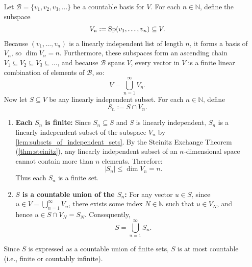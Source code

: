 \begin{exercisesolution}
\label{sol:countable_basis_independent_subsets}
Let $\mathcal{B} = \{v_1, v_2, v_3, \dots\}$ be a countable basis for $V$. For each $n \in \mathbb{N}$, define the subspace
\[
V_n := \operatorname{Sp}(v_1, \dots, v_n) \subseteq V.
\]
Because $(v_1, \dots, v_n)$ is a linearly independent list of length $n$, it forms a basis of $V_n$, so $\dim V_n = n$. Furthermore, these subspaces form an ascending chain $V_1 \subseteq V_2 \subseteq V_3 \subseteq \dots$, and because $\mathcal{B}$ spans $V$, every vector in $V$ is a finite linear combination of elements of $\mathcal{B}$, so:
\[
V = \bigcup_{n=1}^\infty V_n.
\]
Now let $S \subseteq V$ be any linearly independent subset. For each $n \in \mathbb{N}$, define
\[
S_n := S \cap V_n.
\]
\begin{enumerate}[label=\textbf{(\arabic*)}]
    \item \textbf{Each $S_n$ is finite:}
    Since $S_n \subseteq S$ and $S$ is linearly independent, $S_n$ is a linearly independent subset of the subspace $V_n$ by \cref{lem:subsets_of_independent_sets}. By the Steinitz Exchange Theorem (\cref{thm:steinitz}), any linearly independent subset of an $n$-dimensional space cannot contain more than $n$ elements. Therefore:
    \[
    |S_n| \le \dim V_n = n.
    \]
    Thus each $S_n$ is a finite set.

    \item \textbf{$S$ is a countable union of the $S_n$:}
    For any vector $u \in S$, since $u \in V = \bigcup_{n=1}^\infty V_n$, there exists some index $N \in \mathbb{N}$ such that $u \in V_N$, and hence $u \in S \cap V_N = S_N$. Consequently,
    \[
    S = \bigcup_{n=1}^\infty S_n.
    \]
\end{enumerate}
Since $S$ is expressed as a countable union of finite sets, $S$ is at most countable (i.e., finite or countably infinite).
\end{exercisesolution}
